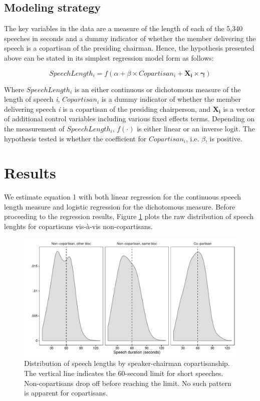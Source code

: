 \documentclass[12pt,a4paper]{article}
\begin{document}
\subsection{Modeling strategy}
The key variables in the data are a measure of the length of each of the 5,340 speeches in seconds and a dummy indicator of whether the member delivering the speech is a copartisan of the presiding chairman. Hence, the hypothesis presented above can be stated in its simplest regression model form as follows:

\begin{equation}\label{model}
SpeechLength_i = f( \alpha + \beta \times Copartisan_i + \mathbf{X_i\times\gamma} )
\end{equation}

Where $SpeechLength_i$ is an either continuous or dichotomous measure of the length of speech \textit{i}, $Copartisan_i$ is a dummy indicator of whether the member delivering speech \textit{i} is a copartisan of the presiding chairperson, and $\mathbf{X_i}$ is a vector of additional control variables including various fixed effects terms. Depending on the measurement of $SpeechLength_i$, $f(\cdot)$ is either linear or an inverse logit. The hypothesis tested is whether the coefficient for \textit{$Copartisan_i$}, i.e. \textit{$\beta$}, is positive.

\section{Results}\label{res}

\noindent We estimate equation 1 with both linear regression for the continuous speech length measure and logistic regression for the dichotomous measure. Before proceeding to the regression results, Figure \ref{parlbias_dens} plots the raw distribution of speech lenghts for copartisans vis-à-vis non-copartisans.

\begin{figure}[h]
\centering
\includegraphics[scale=.70]{../figures/parlbias_dens}
  \caption{Distribution of speech lengths by speaker-chairman copartisanship. The vertical line indicates the 60-second limit for short speeches. Non-copartisans drop off before reaching the limit. No such pattern is apparent for copartisans.}\label{parlbias_dens}
\end{figure}
\end{document}
